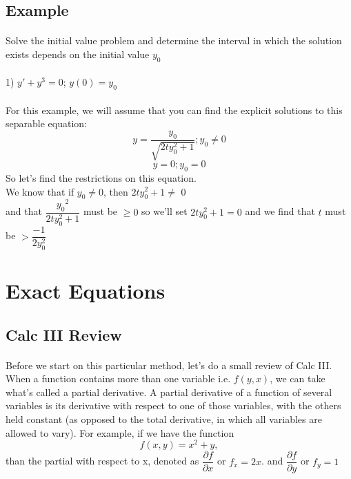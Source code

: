 \documentclass[font =22]{report}
\begin{document}
\subsection*{Example}
\paragraph{}
Solve the initial value problem and determine the interval in which the
solution exists depends on the initial value $y_0$

\paragraph{}
1)
$y'+y^3 = 0$;      $y(0) = y_0$\\\\
For this example, we will assume that you can find the explicit solutions to this separable equation:
\[
y =  \frac{{y_0}}{\sqrt{2ty_0^2+1}}; y_0\neq 0
\]
\[
y=0; y_0 = 0
\]
So let's find the restrictions on this equation. 
\\We know that if $y_0 \neq 0$, then $2ty_0^2+1 \neq$ 0
\\and that $\dfrac{{y_0}^2}{2ty_0^2+1}$ must be $\geq 0$
so we'll set $2ty_0^2+1 = 0$ and we find that $t$ must be $> \dfrac{-1}{2y_0^2}$




\section{Exact Equations}
\subsection{Calc III Review}
\paragraph{}
Before we start on this particular method, let's do a small review of Calc III. When a function contains more than one variable i.e. $f(y,x)$, we can take what's called a partial derivative. A partial derivative of a function of several variables is its derivative with respect to one of those variables, with the others held constant (as opposed to the total derivative, in which all variables are allowed to vary). For example, if we have the function 
\[
f(x,y) = x^2+y, 
\]
than the partial with respect to x, denoted as $\dfrac{\partial f}{\partial x}$  or $f_x = 2x$. and 
$\dfrac{\partial f}{\partial y}$ or $f_y = 1$
\end{document}
